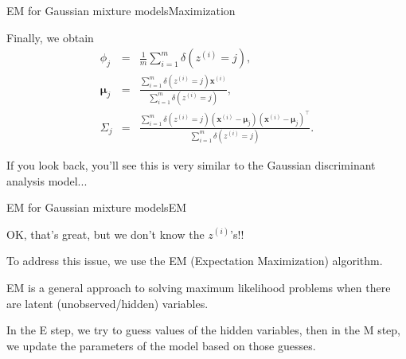 \documentclass{beamer}
\renewcommand{\vec}[1]{\boldsymbol{#1}}
\newcommand{\mat}[1]{\mathtt{#1}}
\begin{document}
\begin{frame}{EM for Gaussian mixture models}{Maximization}

  Finally, we obtain
  \begin{eqnarray*}
    \phi_j & = & \frac{1}{m} \sum_{i=1}^m \delta(z^{(i)} = j), \\
    \vec{\mu}_j & = & \frac{\sum_{i=1}^m \delta(z^{(i)} = j)\vec{x}^{(i)}}{
      \sum_{i=1}^m\delta(z^{(i)} = j)}, \\
    \mat{\Sigma}_j & = & \frac{\sum_{i=1}^m \delta(z^{(i)}=j)(\vec{x}^{(i)}-\vec{\mu}_j)
      (\vec{x}^{(i)}-\vec{\mu}_j)^\top}{\sum_{i=1}^m \delta(z^{(i)}=j)} .
  \end{eqnarray*}

  If you look back, you'll see this is very similar to the Gaussian
  discriminant analysis model...
  
\end{frame}


\begin{frame}{EM for Gaussian mixture models}{EM}

  OK, that's great, but \alert{we don't know the $z^{(i)}$'s}!!

  \medskip

  To address this issue, we use the \alert{EM (Expectation Maximization) algorithm}.

  \medskip
  
  EM is a general approach to solving maximum likelihood problems when there
  are latent (unobserved/hidden) variables.

  \medskip

  In the E step, we try to \alert{guess values of the hidden
    variables}, then in the M step, we \alert{update the parameters of
    the model based on those guesses}.
  
\end{frame}
\end{document}

